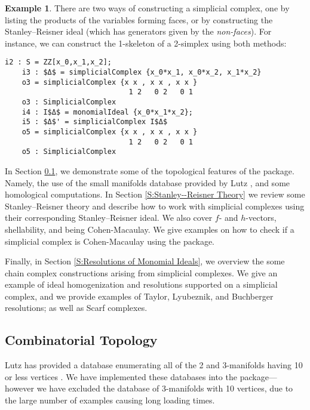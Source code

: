 \documentclass[12pt,leqno]{amsart}
\theoremstyle{definition}
\newtheorem{example}[lemma]{Example}
\begin{document}
\begin{example}\label{example of using database}
  There are two ways of constructing a simplicial complex, one by listing the
  products of the variables forming faces, or by constructing the
  Stanley--Reisner ideal (which has generators given by the
  \textit{non-faces}). For instance, we can construct the 1-skeleton of a
  2-simplex using both methods:
  \begin{lstlisting}[basicstyle={\ttfamily \scriptsize}, xleftmargin=-23pt]
    i2 : S = ZZ[x_0,x_1,x_2];
    i3 : $Δ$ = simplicialComplex {x_0*x_1, x_0*x_2, x_1*x_2}
    o3 = simplicialComplex {x x , x x , x x }
                             1 2   0 2   0 1
    o3 : SimplicialComplex
    i4 : I$Δ$ = monomialIdeal {x_0*x_1*x_2};
    i5 : $Δ$' = simplicialComplex I$Δ$
    o5 = simplicialComplex {x x , x x , x x }
                             1 2   0 2   0 1
    o5 : SimplicialComplex
  \end{lstlisting}
\end{example}

In Section \ref{S:Combinatorial Topology}, we demonstrate some of the
topological features of the package. Namely, the use of the small manifolds
database provided by Lutz \cite{LutzM}, and some homological computations. In
Section \ref{S:Stanley--Reisner Theory} we review some Stanley--Reisner theory
and describe how to work with simplicial complexes using their corresponding
Stanley--Reisner ideal. We also cover $f$- and $h$-vectors, shellability, and
being Cohen-Macaulay. We give examples on how to check if a simplicial complex
is Cohen-Macaulay using the package.

Finally, in Section \ref{S:Resolutions of Monomial Ideals}, we overview the
some chain complex constructions arising from simplicial complexes. We give an
example of ideal homogenization and resolutions supported on a simplicial
complex, and we provide examples of Taylor, Lyubeznik, and Buchberger
resolutions; as well as Scarf complexes.

\addtocounter{section}{1}
\subsection{Combinatorial Topology}
\label{S:Combinatorial Topology}

Lutz has provided a database enumerating all of the 2 and 3-manifolds having
10 or less vertices \cite{LutzM}. We have implemented these databases into the
package---however we have excluded the database of 3-manifolds with 10
vertices, due to the large number of examples causing long loading times.
\end{document}
